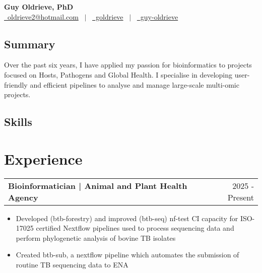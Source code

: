 \documentclass[a4paper,11pt]{article}
\makeatletter
\newenvironment{joblong}[2]{
  \begin{tabularx}{\linewidth}{@{}l X r@{}}
  \textbf{#1} & & #2 \\[2pt]
  \end{tabularx}
  \begin{itemize}[leftmargin=1.2em, itemsep=3pt, label=-]
}{
  \end{itemize}
}
\makeatother
\begin{document}
\pagestyle{empty}


\begin{center}
    {\Huge \textbf{Guy Oldrieve, PhD}} \\[6pt]
    \href{mailto:oldrieve2@hotmail.com}{\faEnvelope\ oldrieve2@hotmail.com}  \ $|$ \ 
    \href{https://github.com/goldrieve}{\faGithub\ goldrieve}  \ $|$ \ 
    \href{https://linkedin.com/in/guy-oldrieve}{\faLinkedin\ guy-oldrieve}
    \end{center}

\begin{multicols}{2}
\subsection*{Summary}
Over the past six years, I have applied my passion for bioinformatics to projects focused on Hosts, Pathogens and Global Health. I specialise in developing user-friendly and efficient pipelines to analyse and manage large-scale multi-omic projects.

\columnbreak

\subsection*{Skills}
       
\end{multicols}

\section{Experience}

\begin{joblong}{Bioinformatician | Animal and Plant Health Agency}{2025 - Present}
\item Developed (btb-forestry) and improved (btb-seq) nf-test CI capacity for ISO-17025 certified Nextflow pipelines used to process sequencing data and perform phylogenetic analysis of bovine TB isolates
\item Created btb-sub, a nextflow pipeline which automates the submission of routine TB sequencing data to ENA
\end{joblong}
\end{document}
